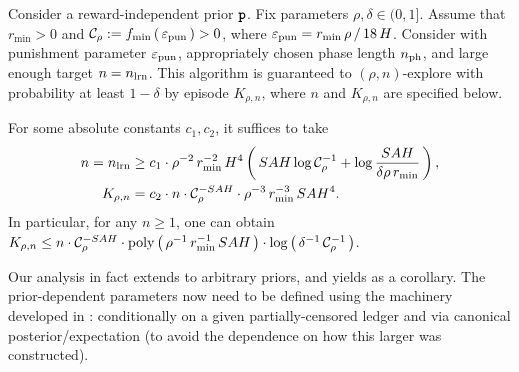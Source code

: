 \begin{theorem}\label{thm:main_indep}
Consider a reward-independent prior ${\normalfont \texttt{\textbf{p}}}$. Fix parameters $\rho, \delta\in (0,1]$. Assume that $r_{\min}>0$ and
    $\mathcal{C}_{\rho}  := f_{\min}\left(\, \varepsilon_{\mathrm{pun}}\,\right)>0$,
where
    $\varepsilon_{\mathrm{pun}} = r_{\min}\,\rho\,/\, 18\,H$.
Consider  with punishment parameter $\varepsilon_{\mathrm{pun}}$, appropriately chosen phase length $n_{\mathrm{ph}}$, and large enough target $n=n_{\mathrm{lrn}}$. This algorithm is guaranteed to $(\rho,n)$-explore with probability at least $1-\delta$ by episode $K_{\rho,n}$, where $n$ and $K_{\rho,n}$ are specified below.


For some absolute constants $c_1,c_2$, it suffices to take
\begin{align*}
n = n_{\mathrm{lrn}} &\ge
     c_1\cdot \rho^{-2}\, r_{\min}^{-2}\,
     H^4 \left(\, SAH \log \mathcal{C}_{\rho}^{-1} +
        \log \frac{ SAH}{\delta\rho\, r_{\min}} \,\right), \\
K_{\rho,n} &= c_2\cdot n\cdot \mathcal{C}_{\rho}^{-SAH} \cdot \rho^{-3}\, r_{\min}^{-3}\, SAH^4.
\end{align*}
In particular, for any $n\geq 1$, one can obtain
    $K_{\rho,n} \leq n\cdot  \calC_{\rho}^{-SAH}
        \cdot \poly\rbr{\rho^{-1}\, r_{\min}^{-1}\, SAH  }
        \cdot \log\rbr{\delta^{-1}\,\calC_{\rho}^{-1}}$.
\end{theorem}


Our analysis in fact extends to arbitrary priors, and yields  as a corollary. The prior-dependent parameters now need to be defined using the machinery developed in : conditionally on a given partially-censored ledger and via canonical posterior/expectation (to avoid the dependence on how this larger was constructed).



